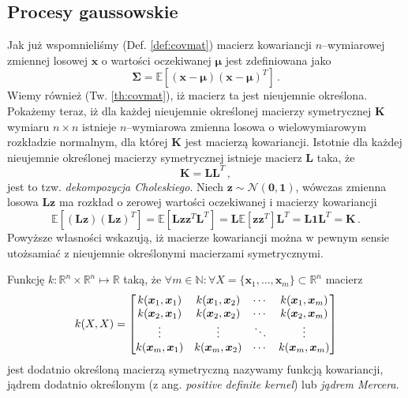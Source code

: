 \documentclass{myclass}
\numberwithin{equation}{subsection}
\begin{document}
\subsection{Procesy gaussowskie}

Jak już wspomnieliśmy (Def. \ref{def:covmat}) macierz kowariancji \(n\)--wymiarowej zmiennej losowej
\(\bm{x}\) o wartości oczekiwanej \(\bm{\mu}\) jest zdefiniowana jako
\begin{equation}
    \bm{\Sigma} = \mathbb{E}\left[(\bm{x} - \bm{\mu})(\bm{x} - \bm{\mu})^T\right]\,.
\end{equation}
Wiemy również (Tw. \ref{th:covmat}), iż macierz ta jest nieujemnie określona. Pokażemy teraz, iż dla
każdej nieujemnie określonej macierzy symetrycznej \(\bm{K}\) wymiaru \(n\times n\) istnieje
\(n\)--wymiarowa zmienna losowa o wielowymiarowym rozkładzie normalnym, dla której \(\bm{K}\) jest
macierzą kowariancji. Istotnie dla każdej nieujemnie określonej macierzy symetrycznej istnieje
macierz \(\bm{L}\) taka, że
\begin{equation}
    \bm{K} = \bm{L}\bm{L}^T\,,
\end{equation}
jest to tzw. \emph{dekompozycja Choleskiego}. Niech \(\bm{z} \sim \mathcal{N}(\bm{0}, \bm{1})\),
wówczas zmienna losowa \(\bm{L}\bm{z}\) ma rozkład o zerowej wartości oczekiwanej i macierzy
kowariancji
\begin{equation}
    \mathbb{E}\left[(\bm{L}\bm{z})(\bm{L}\bm{z})^T\right] = \mathbb{E}\left[\bm{L}\bm{z}\bm{z}^T\bm{L}^T\right] = \bm{L}\mathbb{E}[\bm{z}\bm{z}^T]\bm{L}^T = \bm{L}\bm{1}\bm{L}^T = \bm{K}\,.
\end{equation}
Powyższe własności wskazują, iż macierze kowariancji można w pewnym sensie utożsamiać z nieujemnie
określonymi macierzami symetrycznymi.

\begin{definition}
Funkcję \(k: \mathbb{R}^n\times\mathbb{R}^n\mapsto\mathbb{R}\) taką, że \(\forall m\in\mathbb{N} :
\forall X = \{\bm{x}_1,\ldots,\bm{x}_m\} \subset \mathbb{R}^n\) macierz
\begin{equation*}
    k(X,X) = \mqty[k(\bm{x}_1, \bm{x}_1) & k(\bm{x}_1, \bm{x}_2) & \cdots & k(\bm{x}_1, \bm{x}_m)\\
    k(\bm{x}_2, \bm{x}_1) & k(\bm{x}_2, \bm{x}_2) & \cdots & k(\bm{x}_2, \bm{x}_m)\\
    \vdots & \vdots & \ddots & \vdots\\
    k(\bm{x}_m, \bm{x}_1) & k(\bm{x}_m, \bm{x}_2) & \cdots & k(\bm{x}_m, \bm{x}_m)\\]
\end{equation*}
jest dodatnio określoną macierzą symetryczną nazywamy funkcją kowariancji, jądrem dodatnio
określonym (z ang. \textit{positive definite kernel}) lub \emph{jądrem Mercera}.
\end{definition}
\end{document}
